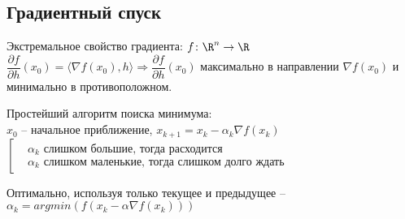 \subsection{Градиентный спуск}

Экстремальное свойство градиента: $f \colon \R^n \to \R$\\
$\dfrac{\partial f}{\partial h}(x_0) = \langle \nabla f(x_0), h \rangle \Rightarrow \dfrac{\partial f}{\partial h}(x_0)$ максимально в направлении $\nabla f(x_0)$ и минимально в противоположном.

Простейший алгоритм поиска минимума:\\
$x_0$ -- начальное приближение, $x_{k + 1} = x_k - \alpha_k \nabla f(x_k)$\\
$\left[\begin{aligned}
&\alpha_k \text{ слишком большие, тогда расходится} \\
&\alpha_k \text{ слишком маленькие, тогда слишком долго ждать}
\end{aligned}\right.$

Оптимально, используя только текущее и предыдущее -- $\alpha_k = argmin (f(x_k - \alpha \nabla f(x_k)))$

